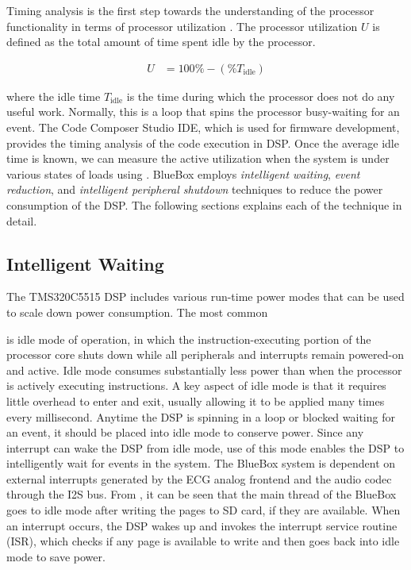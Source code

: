 Timing analysis is the first step towards the understanding of the
processor functionality in terms of processor utilization
\cite{sastra}. The processor utilization $U$ is defined as the total
amount of time spent idle by the processor. 

\begin{align}
	U &= 100\% - (\% T_\text{idle})
\label{eq:idleUtil}
\end{align}

where the idle time $T_\text{idle}$ is the time during which the
processor does not do any useful work. Normally, this is a loop that
spins the processor busy-waiting for an event. The Code Composer
Studio IDE, which is used for firmware development, provides the
timing analysis of the code execution in DSP. Once the average idle
time is known, we can measure the active utilization when the system
is under various states of loads using . BlueBox
employs \emph{intelligent waiting}, \emph{event reduction}, and
\emph{intelligent peripheral shutdown} techniques to reduce the power
consumption of the DSP. The following sections explains each of the
technique in detail. 

\subsection{Intelligent Waiting}

The TMS320C5515 DSP includes various run-time power modes that can be
used to scale down power consumption. The most common

is idle mode of operation, in which the instruction-executing portion
of the processor core shuts down while all peripherals and interrupts
remain powered-on and active. Idle mode consumes substantially less
power than when the processor is actively executing instructions. A
key aspect of idle mode is that it requires little overhead to enter
and exit, usually allowing it to be applied many times every
millisecond.  Anytime the DSP is spinning in a loop or blocked
waiting for an event, it should be placed into idle mode to conserve
power. Since any interrupt can wake the DSP from idle mode, use of
this mode enables the DSP to intelligently wait for events in the
system. The BlueBox system is dependent on external interrupts
generated by the ECG analog frontend and the audio codec through the
I2S bus. From , it can be seen that the main thread of the
BlueBox goes to idle mode after writing the pages to SD card, if they
are available.  When an interrupt occurs, the DSP wakes up and
invokes the interrupt service routine (ISR), which checks if any page
is available to write and then goes back into idle mode to save
power. 


